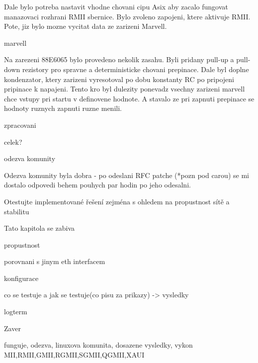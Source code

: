 Dale bylo potreba nastavit vhodne chovani cipu Asix aby zacalo fungovat manazovaci rozhrani RMII sbernice. Bylo zvoleno zapojeni, ktere aktivuje RMII. Pote, jiz bylo mozne vycitat data ze zarizeni Marvell.

\secc marvell

Na zarezeni 88E6065 bylo provedeno nekolik zasahu. Byli pridany pull-up a pull-down rezistory pro spravne a deterministicke chovani prepinace.
Dale byl doplne kondenzator, ktery zarizeni vyresotoval po dobu konstanty RC po pripojeni pripinace k napajeni. Tento kro byl dulezity ponevadz vsechny zarizeni marvell chce vstupy pri startu v definovene hodnote. A stavalo ze pri zapnuti prepinace se hodnoty ruznych zapnuti ruzne menili.

\sec zpracovani

\sec celek?

\sec odezva komunity

Odezva komunity byla dobra - po odeslani RFC patche (*pozn pod carou) se mi dostalo odpovedi behem pouhych par hodin po jeho odesalni.

\chap Otestujte implementované řešení zejména s ohledem na propustnost sítě a stabilitu

Tato kapitola se zabiva

\sec propustnost

\sec porovnani s jinym eth interfacem

\sec konfigurace 

co se testuje a jak se testuje(co pisu za prikazy) -> vysledky

\sec logterm

\chap Zaver

funguje, odezva, linuxova komunita, dosazene vysledky, vykon
MII,RMII,GMII,RGMII,SGMII,QGMII,XAUI

